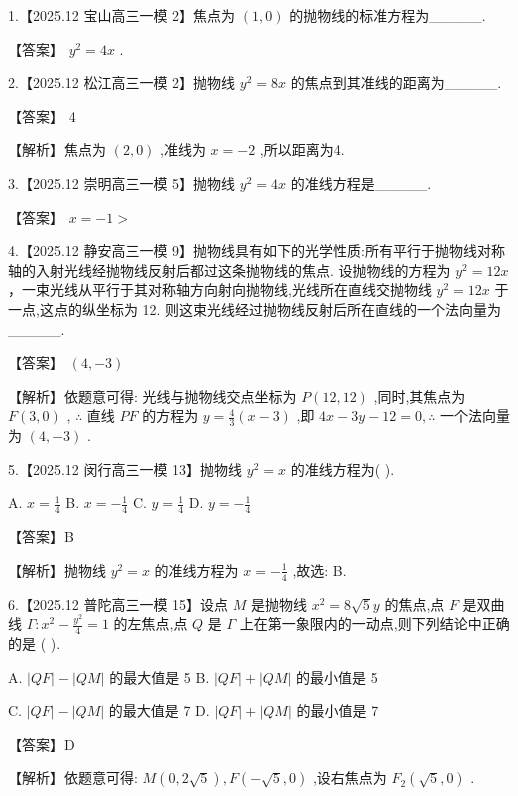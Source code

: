 \documentclass[10pt]{article}
\begin{document}
1.【2025.12 宝山高三一模 2】焦点为 \(\left( {1,0}\right)\) 的抛物线的标准方程为\_\_\_\_\_.

【答案】 \({y}^{2} = {4x}\) .

2.【2025.12 松江高三一模 2】抛物线 \({y}^{2} = {8x}\) 的焦点到其准线的距离为\_\_\_\_\_.

【答案】 4

【解析】焦点为 \(\left( {2,0}\right)\) ,准线为 \(x =  - 2\) ,所以距离为4.

3.【2025.12 崇明高三一模 5】抛物线 \({y}^{2} = {4x}\) 的准线方程是\_\_\_\_\_.

【答案】 \(x =  - 1 >\)

4.【2025.12 静安高三一模 9】抛物线具有如下的光学性质:所有平行于抛物线对称轴的入射光线经抛物线反射后都过这条抛物线的焦点. 设抛物线的方程为 \({y}^{2} = {12x}\) ，一束光线从平行于其对称轴方向射向抛物线,光线所在直线交抛物线 \({y}^{2} = {12x}\) 于一点,这点的纵坐标为 12. 则这束光线经过抛物线反射后所在直线的一个法向量为\_\_\_\_\_.

【答案】 \(\left( {4, - 3}\right)\)

【解析】依题意可得: 光线与抛物线交点坐标为 \(P\left( {{12},{12}}\right)\) ,同时,其焦点为 \(F\left( {3,0}\right)\) , \(\therefore\) 直线 \({PF}\) 的方程为 \(y = \frac{4}{3}\left( {x - 3}\right)\) ,即 \({4x} - {3y} - {12} = 0,\therefore\) 一个法向量为 \(\left( {4, - 3}\right)\) .

5.【2025.12 闵行高三一模 13】抛物线 \({y}^{2} = x\) 的准线方程为( ).

A. \(x = \frac{1}{4}\) B. \(x =  - \frac{1}{4}\) C. \(y = \frac{1}{4}\) D. \(y =  - \frac{1}{4}\)

【答案】B

【解析】抛物线 \({y}^{2} = x\) 的准线方程为 \(x =  - \frac{1}{4}\) ,故选: B.

6.【2025.12 普陀高三一模 15】设点 \(M\) 是抛物线 \({x}^{2} = 8\sqrt{5}y\) 的焦点,点 \(F\) 是双曲线 \(\Gamma  : {x}^{2} - \frac{{y}^{2}}{4} = 1\) 的左焦点,点 \(Q\) 是 \(\Gamma\) 上在第一象限内的一动点,则下列结论中正确的是 ( ).

A. \(\left| {QF}\right|  - \left| {QM}\right|\) 的最大值是 5 B. \(\left| {QF}\right|  + \left| {QM}\right|\) 的最小值是 5

C. \(\left| {QF}\right|  - \left| {QM}\right|\) 的最大值是 7 D. \(\left| {QF}\right|  + \left| {QM}\right|\) 的最小值是 7

【答案】D

【解析】依题意可得: \(M\left( {0,2\sqrt{5}}\right) ,F\left( {-\sqrt{5},0}\right)\) ,设右焦点为 \({F}_{2}\left( {\sqrt{5},0}\right)\) .
\end{document}
